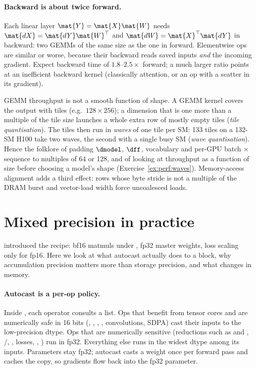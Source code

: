 \paragraph{Backward is about twice forward.} Each linear layer $\mat{Y}=\mat{X}\mat{W}$ needs
$\mat{dX}=\mat{dY}\mat{W}^\top$ and $\mat{dW}=\mat{X}^\top\mat{dY}$ in backward: two GEMMs of the
same size as the one in forward. Elementwise ops are similar or worse, because their backward
reads saved inputs \emph{and} the incoming gradient. Expect backward time of
$1.8$--$2.5\times$ forward; a much larger ratio points at an inefficient backward kernel (classically
attention, or an op with a scatter in its gradient).

\begin{systemslens}
GEMM throughput is not a smooth function of shape. A GEMM kernel covers the output with tiles
(e.g.\ $128\times256$); a dimension that is one more than a multiple of the tile size launches a
whole extra row of mostly empty tiles (\emph{tile quantisation}). The tiles then run in
\emph{waves} of one tile per SM: 133 tiles on a 132-SM H100 take two waves, the second with a
single busy SM (\emph{wave quantisation}). Hence the folklore of padding $\dmodel$, $\dff$,
vocabulary and per-GPU batch $\times$ sequence to multiples of 64 or 128, and of looking at
throughput as a function of size before choosing a model's shape (Exercise~\ref{ex:perf:waves}).
Memory-access alignment adds a third effect: rows whose byte stride is not a multiple of the
DRAM burst and vector-load width force uncoalesced loads.
\end{systemslens}

\section{Mixed precision in practice}\label{sec:perf:amp}

 introduced the recipe: bf16 matmuls under ,
fp32 master weights, loss scaling only for fp16. Here we look at what autocast actually does to
a block, why accumulation precision matters more than storage precision, and what changes in
memory.

\paragraph{Autocast is a per-op policy.} Inside , each
operator consults a list. Ops that benefit from tensor cores and are numerically safe in 16 bits
(, , , , convolutions, SDPA) cast their inputs to the
low-precision dtype. Ops that are numerically sensitive (reductions such as  and
, /, , losses, ,
) run in fp32. Everything else runs in the widest dtype among its inputs. Parameters
stay fp32; autocast casts a weight once per forward pass and caches the copy, so gradients flow
back into the fp32 parameter.

